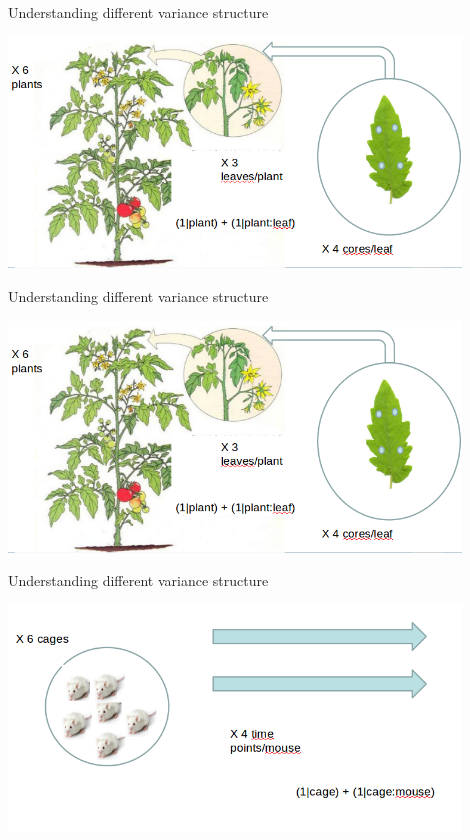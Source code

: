 \documentclass{beamer}
\begin{document}
\begin{frame}{Understanding different variance structure}
 
 \begin{center}
  \includegraphics[width=0.9\textwidth]{Figures/nestedtomatoes}
 \end{center}

\end{frame}

\begin{frame}{Understanding different variance structure}
 
 \begin{center}
  \includegraphics[width=0.9\textwidth]{Figures/nestedtomatoes}
 \end{center}

\end{frame}


\begin{frame}{Understanding different variance structure}
 
 \begin{center}
  \includegraphics[width=0.9\textwidth]{Figures/nestedmice}
 \end{center}

\end{frame}
\end{document}
